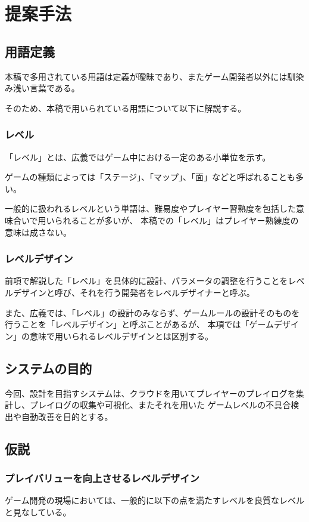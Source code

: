 \chapter{提案手法}
\section{用語定義}
本稿で多用されている用語は定義が曖昧であり、またゲーム開発者以外には馴染み浅い言葉である。

そのため、本稿で用いられている用語について以下に解説する。

\subsection{レベル}
「レベル」とは、広義ではゲーム中における一定のある小単位を示す。

ゲームの種類によっては「ステージ」、「マップ」、「面」などと呼ばれることも多い。

一般的に扱われるレベルという単語は、難易度やプレイヤー習熟度を包括した意味合いで用いられることが多いが、
本稿での「レベル」はプレイヤー熟練度の意味は成さない。


\subsection{レベルデザイン}
前項で解説した「レベル」を具体的に設計、パラメータの調整を行うことをレベルデザインと呼び、それを行う開発者をレベルデザイナーと呼ぶ。


また、広義では、「レベル」の設計のみならず、ゲームルールの設計そのものを行うことを「レベルデザイン」と呼ぶことがあるが、
本項では「ゲームデザイン」の意味で用いられるレベルデザインとは区別する。

\section{システムの目的}
今回、設計を目指すシステムは、クラウドを用いてプレイヤーのプレイログを集計し、プレイログの収集や可視化、またそれを用いた
ゲームレベルの不具合検出や自動改善を目的とする。

\section{仮説}
\subsection{プレイバリューを向上させるレベルデザイン}
ゲーム開発の現場においては、一般的に以下の点を満たすレベルを良質なレベルと見なしている。

